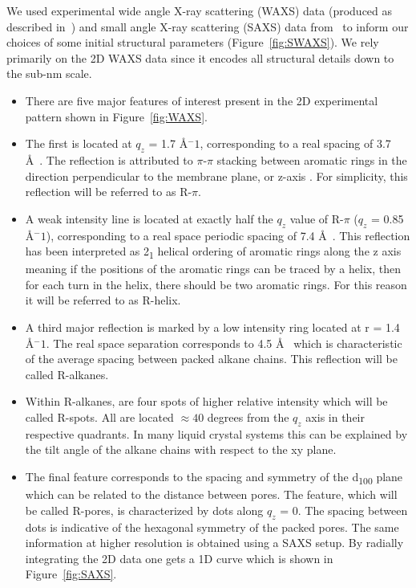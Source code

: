\documentclass{article}
\newcommand{\angstrom}{\textup{\AA}}
\begin{document}
  We used experimental wide angle X-ray scattering (WAXS) data (produced as described 
  in~\cite{feng_scalable_2014}) and small angle X-ray scattering (SAXS) data from~\cite{feng_thin_2016}
  to inform our choices of some initial structural parameters (Figure~\ref{fig:SWAXS}). We rely primarily
  on the 2D WAXS data since it encodes all structural details down to the sub-nm scale.
  \begin{itemize}
        \item There are five major features of interest present in the 2D experimental
        pattern shown in Figure~\ref{fig:WAXS}.
        \item The first is located at $q_z$ = 1.7 \angstrom$^-1$,
        corresponding to a real spacing of 3.7 \angstrom~. The reflection is
        attributed to $\pi$-$\pi$ stacking between aromatic rings in the direction
        perpendicular to the membrane plane, or z-axis \cite{feng_scalable_2014}. For simplicity, this
        reflection will be referred to as R-$\pi$.
        \item A weak intensity line is located at exactly half the $q_z$ value of
        R-$\pi$ ($q_z$ = 0.85 \angstrom$^-1$), corresponding to a
        real space periodic spacing of 7.4 \angstrom~. This reflection has been
        interpreted  as 2\textsubscript{1} helical ordering of aromatic rings
        along the z axis meaning if the positions of the aromatic rings can
        be traced by a helix, then for each turn in the helix, there should be
        two aromatic rings. For this reason it will be referred to as R-helix.
        \item A third major reflection is marked by a low intensity ring located
        at r = 1.4 \angstrom$^-1$. The real space separation
        corresponds to 4.5 \angstrom~ which is characteristic of the average
        spacing between packed alkane chains. This reflection will be called R-alkanes.
        \item Within R-alkanes, are four spots of higher relative intensity which
        will be called R-spots. All are located $\approx 40$ degrees from the $q_z$ axis
        in their respective quadrants. In many liquid crystal systems this can be
        explained by the tilt angle of the alkane chains with respect to the xy plane. %
        \item The final feature corresponds to the spacing and symmetry of
        the d\textsubscript{100} plane which can be related to the distance between
        pores. The feature, which will be called R-pores, is characterized by dots
        along $q_z$ = 0. The spacing between dots is indicative of the hexagonal
        symmetry of the packed pores. The same information at higher resolution is obtained using a SAXS
        setup. By radially integrating the 2D data one gets a 1D curve which is 
        shown in Figure~\ref{fig:SAXS}.  %
  \end{itemize}
\end{document}
